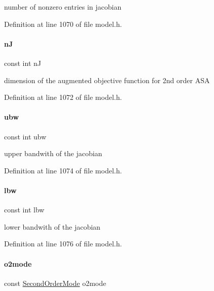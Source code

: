 number of nonzero entries in jacobian 

Definition at line 1070 of file model.\+h.

\mbox{\label{classamici_1_1_model_a0d2f49d2b15b08628451261e52f56e4f}} 
\paragraph{\texorpdfstring{nJ}{nJ}}
{\footnotesize\ttfamily const int nJ}

dimension of the augmented objective function for 2nd order A\+SA 

Definition at line 1072 of file model.\+h.

\mbox{\label{classamici_1_1_model_a8aac2b651892bb766a3cb79868944d81}} 
\paragraph{\texorpdfstring{ubw}{ubw}}
{\footnotesize\ttfamily const int ubw}

upper bandwith of the jacobian 

Definition at line 1074 of file model.\+h.

\mbox{\label{classamici_1_1_model_aa19cd03fcaffb7a0cebd666081c5a868}} 
\paragraph{\texorpdfstring{lbw}{lbw}}
{\footnotesize\ttfamily const int lbw}

lower bandwith of the jacobian 

Definition at line 1076 of file model.\+h.

\mbox{\label{classamici_1_1_model_acc235cad50283f7891e2d834f1cbeb90}} 
\paragraph{\texorpdfstring{o2mode}{o2mode}}
{\footnotesize\ttfamily const \mbox{\hyperlink{namespaceamici_a2d77779286167d5603a870bf9f6c21ba}{Second\+Order\+Mode}} o2mode}

